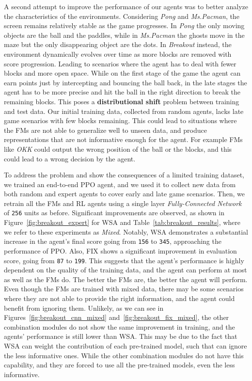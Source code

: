 A second attempt to improve the performance of our agents was to better analyze the characteristics of the environments.
Considering \textit{Pong} and \textit{Ms.Pacman}, the screen remains relatively stable as the game progresses.
In \textit{Pong} the only moving objects are the ball and the paddles, while in \textit{Ms.Pacman} the ghosts move in the maze but the only disappearing object are the dots.
In \textit{Breakout} instead, the environment dynamically evolves over time as more blocks are removed with score progression.
Leading to scenarios where the agent has to deal with fewer blocks and more open space.
While on the first stage of the game the agent can earn points just by intercepting and bouncing the ball back, in the late stages the agent has to be more precise and hit the ball in the right direction to break the remaining blocks.
This poses a \textbf{distributional shift} problem between training and test data.
Our initial training data, collected from random agents, lacks late game scenarios with few blocks remaining.
This could lead to situations where the FMs are not able to generalize well to unseen data, and produce representations that are not informative enough for the agent.
For example FMs like \textit{OKK} could output the wrong position of the ball or the blocks, and this could lead to a wrong decision by the agent.


To address the problem and show the consequences of a limited training dataset, we trained an end-to-end PPO agent, and we used it to collect new data from both random and expert agents to cover early and late game scenarios.
Then, we retrain all the FMs and RL agents using a single layer \textit{Fully-Connected Network} of \texttt{256} units as before.
Significant improvements are observed, as shown in Figure~\ref{fig:breakout_expert} for WSA and Table~\ref{tab:breakout_results}, where we refer to these experiments as \textit{Mixed}.
Notably, WSA demonstrates a substantial increase in the agent's final score going from \texttt{156} to \texttt{345}, approaching the performance of PPO\@.
Also, FIX shows a significant improvement in evaluation score, going from \texttt{87} to \texttt{199}.
This suggests that the agent's performance is highly dependent on the quality of the training data, and the agent can perform at most as well as the FMs do.
The better the FMs are, the better the agent will perform.
Even though the FMs are trained with mixed data, there may be some scenarios where they are not able to provide the right information, and the agent could benefit from ignoring them.
Unlikely, as we can see in Figures~\ref{fig:breakout_cnn_mixed} and~\ref{fig:breakout_fix_mixed}, the other combination modules do not show the same improvement in training, and the agents' performance is still lower than WSA\@.
This may be due to the fact that WSA can weight the contribution of each pre-trained model, such that can ignore the less informative ones.
While the other combination modules do not have this capability, and they are forced to use all the pre-trained models, even the less informative.


